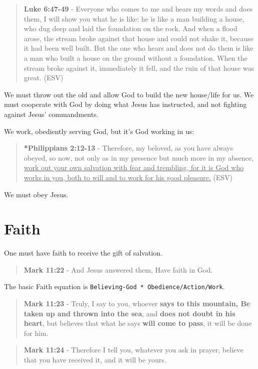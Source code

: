 \documentclass[11pt]{article}
\begin{document}
\begin{quote}
\textbf{Luke 6:47-49} - Everyone who comes to me and hears my words and does them, I will show you what he is like: he is like a man building a house, who dug deep and laid the foundation on the rock. And when a flood arose, the stream broke against that house and could not shake it, because it had been well built. But the one who hears and does not do them is like a man who built a house on the ground without a foundation. When the stream broke against it, immediately it fell, and the ruin of that house was great. (ESV)
\end{quote}

We must throw out the old and allow God to build the new house/life for us.
We must cooperate with God by doing what Jesus has instructed, and not fighting against Jesus' commandments.

We work, obediently serving God, but it's God working in us:

\begin{quote}
\textbf{*Philippians 2:12-13} - Therefore, my beloved, as you have always obeyed, so now, not only as in my presence but much more in my absence, \uline{work out your own salvation with fear and trembling, for it is God who works in you, both to will and to work for his good pleasure.} (ESV)
\end{quote}

We must obey Jesus.

\section{Faith}
\label{sec:org261bfc1}
One must have faith to receive the gift of salvation.

\begin{quote}
\textbf{Mark 11:22} - And Jesus answered them, Have faith in God.
\end{quote}

The basic Faith equation is \texttt{Believing-God * Obedience/Action/Work}.

\begin{quote}
\textbf{Mark 11:23} - Truly, I say to you, whoever \textbf{says to this mountain, Be taken up and thrown into the sea}, and \textbf{does not doubt in his heart}, but believes that what he says \textbf{will come to pass}, it will be done for him.
\end{quote}

\begin{quote}
\textbf{Mark 11:24} - Therefore I tell you, whatever you ask in prayer, believe that you have received it, and it will be yours.
\end{quote}
\end{document}
